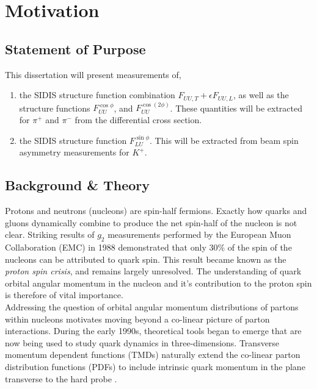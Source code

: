 \section{Motivation}

\subsection{Statement of Purpose}
This dissertation will present measurements of, 

\begin{enumerate}
  \item the SIDIS structure function combination $F_{UU,T} + \epsilon F_{UU,L}$, as well as the structure functions $F_{UU}^{\cos\phi}$, and $F_{UU}^{\cos(2\phi)}$.  These quantities will be extracted for $\pi^+$ and $\pi^-$ from the differential cross section.
  \item the SIDIS structure function $F_{LU}^{\sin\phi}$.  This will be extracted from beam spin asymmetry measurements for $K^{+}$.
\end{enumerate}

\subsection{Background \& Theory}
Protons and neutrons (nucleons) are spin-half fermions.  Exactly how quarks and gluons dynamically combine to produce the net spin-half of the nucleon is not clear.  Striking results of $g_2$ measurements performed by the European Muon Collaboration (EMC) in 1988 \cite{pdfs-leader:1988} demonstrated that only $30\%$ of the spin of the nucleons can be attributed to quark spin.  This result became known as the \textit{proton spin crisis}, and remains largely unresolved.  The understanding of quark orbital angular momentum in the nucleon and it's contribution to the proton spin is therefore of vital importance.  \\

Addressing the question of orbital angular momentum distributions of partons within nucleons motivates moving beyond a co-linear picture of parton interactions.   During the early 1990s, theoretical tools began to emerge that are now being used to study quark dynamics in three-dimensions.  Transverse momentum dependent functions (TMDs) naturally extend the co-linear parton distribution functions (PDFs) to include intrinsic quark momentum in the plane transverse to the hard probe \cite{tmds-mulders:1995, tmds-bacchetta:2006}.  \\

